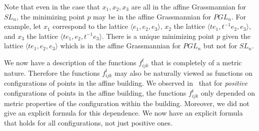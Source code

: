 \begin{rema} Note that even in the case that $x_1, x_2, x_3$ are all in the affine Grassmannian for $SL_n$, the minimizing point $p$ may be in the affine Grassmannian for $PGL_n$. For example, let $x_1$ correspond to the lattice $\langle e_1, e_2, e_3\rangle $, $x_2$ the lattice $\langle te_1, t^{-1}e_2, e_3\rangle $, and $x_3$ the lattice $\langle te_1, e_2, t^{-1}e_3\rangle $. There is a unique minimizing point $p$ given the lattice $\langle te_1, e_2, e_3\rangle $ which is in the affine Grassmannian for $PGL_n$ but not for $SL_n$.
\end{rema}

\begin{rema} We now have a description of the functions $f_{ijk}^t$ that is completely of a metric nature. Therefore the functions $f_{ijk}^t$ may also be naturally viewed as functions on configurations of points in the affine building. We observed in~\cite{Le} that for \emph{positive} configurations of points in the affine building, the functions $f_{ijk}^t$ only depended on metric properties of the configuration within the building. Moreover, we did not give an explicit formula for this dependence. We now have an explicit formula that holds for all configurations, not just positive ones.
\end{rema}



